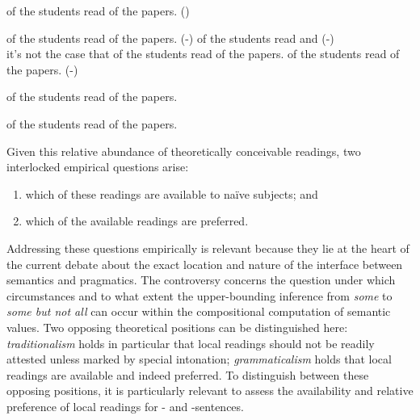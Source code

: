 \documentclass[fleqn,reqno,10pt,draft]{article}
\newcommand{\lit}{\acro{lit}}
\newcommand{\glb}{\acro{glb}}
\newcommand{\loc}{\acro{loc}}
\newcommand{\as}{\acro{as}}
\renewcommand{\es}{\acro{es}}
\begin{document}
\begin{exe}
\ex  \label{bsp:GE}  of the students read {} of the
  papers. \hfill{(\es)}

  \begin{xlist}
  \ex \label{bsp:GE-Literal}  of the students read
    {} of the papers. \hfill (\es-\lit)
  \ex \label{bsp:GE-Global}
     of the students read  
    and  \hfill (\es-\glb)\\
    it's not the case that  of the students read  of the papers.
  \ex \label{bsp:GE-Local}
     of the students read {} of the
    papers. \hfill (\es-\loc)
  \end{xlist}
\end{exe}


\begin{exe}
\ex \label{bsp:AE-Alternative}  of the students read
  {} of the papers. 

\ex \label{bsp:GE-Alternative}  of the students
  read {} of the papers.
\end{exe}


\noindent Given this relative abundance of theoretically conceivable
readings, two interlocked empirical questions arise:
\begin{enumerate}[Q1:]
\item which of these readings are available to na\"{i}ve subjects; and
\item which of the available readings are preferred.
\end{enumerate}
Addressing these questions empirically is relevant because they lie at
the heart of the current debate about the exact location and nature of
the interface between semantics and pragmatics. The controversy
concerns the question under which circumstances and to what extent the
upper-bounding inference from \emph{some} to \emph{some but not all}
can occur within the compositional computation of semantic values. Two
opposing theoretical positions can be distinguished here:
\emph{traditionalism} holds in particular that local readings should
not be readily attested unless marked by special intonation;
\emph{grammaticalism} holds that local readings are available and
indeed preferred. To distinguish between these opposing positions, it
is particularly relevant to assess the availability and relative
preference of local readings for \as- and
\es-sentences. %
\end{document}
